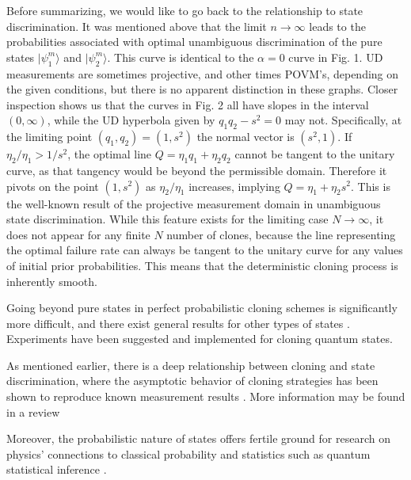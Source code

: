 \documentclass[aps,prl,twocolumn,showpacs]{revtex4}
\begin{document}
Before summarizing, we would like to go back to the relationship to state discrimination.  It was mentioned above that  the limit $n \rightarrow \infty$ leads to the probabilities associated with optimal unambiguous discrimination of the pure states $|\psi_1^m\rangle$ and $|\psi_2^m\rangle$.  This curve is identical to the $\alpha = 0$ curve in Fig. 1.  UD measurements are sometimes projective, and other times POVM's, depending on the given conditions, but there is no apparent distinction in these graphs.  Closer inspection shows us that the curves in Fig. 2 all have slopes in the interval $(0,\infty)$, while the UD hyperbola given by $q_1 q_2 - s^2 = 0$ may not.   Specifically, at the limiting point $(q_1,q_2) = (1,s^2)$ the normal vector is $(s^2,1)$.  If $\eta_2/\eta_1 > 1/s^2$, the optimal line $Q = \eta_1 q_1 + \eta_2 q_2$ cannot be tangent to the unitary curve, as that tangency would be beyond the permissible domain.  Therefore it pivots on the point $(1,s^2)$ as $\eta_2/\eta_1$ increases, implying $Q = \eta_1 + \eta_2 s^2$.  This is the well-known result of the projective measurement domain in unambiguous state discrimination.  While this feature exists for the limiting case $N \rightarrow \infty$, it does not appear for any finite $N$ number of clones, because the line representing the optimal failure rate can always be tangent to the unitary curve for any values of initial prior probabilities.  This means that the deterministic cloning process is inherently smooth.

Going beyond pure states in perfect probabilistic cloning schemes is significantly more difficult, and there exist general results for other types of states  \cite{Fiurasek1,}. Experiments have been suggested \cite{ Fiurasek1} and implemented \cite{Muller} for cloning quantum states.

As mentioned earlier, there is a deep relationship between cloning and state discrimination, where the asymptotic behavior of cloning strategies has been shown to reproduce known measurement results \cite{ Chefles1,Bae}. More information may be found in a review \cite{review1}
  
Moreover, the probabilistic nature of states offers fertile ground for research on physics' connections to classical probability and statistics such as quantum statistical inference \cite{Mallery,Nielsen}. 
\end{document}
